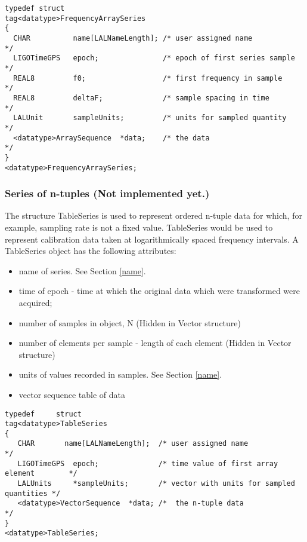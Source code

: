 \documentclass[]{ligodcc}
\begin{document}
{\footnotesize
\begin{verbatim}
typedef struct
tag<datatype>FrequencyArraySeries
{
  CHAR          name[LALNameLength]; /* user assigned name           */
  LIGOTimeGPS   epoch;               /* epoch of first series sample */
  REAL8         f0;                  /* first frequency in sample    */
  REAL8         deltaF;              /* sample spacing in time       */
  LALUnit       sampleUnits;         /* units for sampled quantity   */
  <datatype>ArraySequence  *data;    /* the data                     */
}
<datatype>FrequencyArraySeries;
\end{verbatim}}


\subsubsection{Series of n-tuples  {\bf (Not implemented yet.)} }

The structure TableSeries is used to represent ordered n-tuple data
for which, for example, sampling rate is not a fixed value.
TableSeries would be used to represent calibration data taken at
logarithmically spaced frequency intervals. A TableSeries object has
the following attributes:

\begin{itemize}
\vspace{-0.1in}
\item
name of series. See Section \ref{name}.
\vspace{-0.1in}
\item
time of epoch - time at which the original data which were transformed were acquired;
\vspace{-0.1in}
\item
number of samples in object, N (Hidden in Vector structure)
\vspace{-0.1in}
\item
number of elements per sample - length of each element  (Hidden in Vector structure)
\vspace{-0.1in}
\item
units of values recorded in samples. See Section \ref{name}.
\vspace{-0.1in}
\item
vector sequence table of data
\end{itemize}

{\footnotesize
\begin{verbatim}
typedef		struct
tag<datatype>TableSeries
{
   CHAR       name[LALNameLength];  /* user assigned name                       */
   LIGOTimeGPS  epoch;              /* time value of first array element        */
   LALUnits     *sampleUnits;       /* vector with units for sampled quantities */
   <datatype>VectorSequence  *data; /*  the n-tuple data                        */
}
<datatype>TableSeries;
\end{verbatim}}
\end{document}
